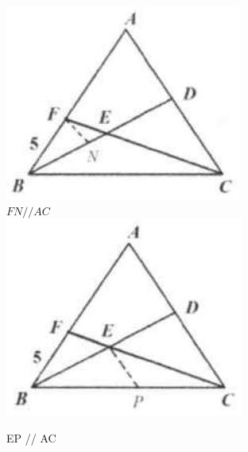 \documentclass{article}
\begin{document}
\includegraphics[width=\textwidth]{images/103(4).jpg}\\
\(F N / / A C\)\\
\centering
\includegraphics[width=\textwidth]{images/103(3).jpg}

EP // AC
\end{document}
